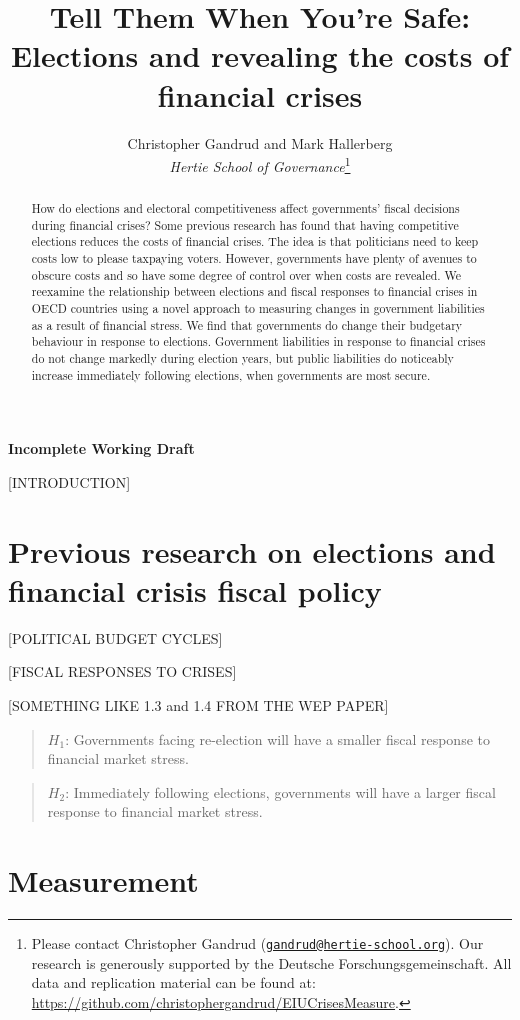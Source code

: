 \documentclass[]{article}
\title{Tell Them When You're Safe: Elections and revealing the costs of financial crises}
\author{Christopher Gandrud and Mark Hallerberg \\ \emph{Hertie School of Governance}\footnote{Please contact Christopher Gandrud
(\href{mailto:gandrud@hertie-school.org}{\nolinkurl{gandrud@hertie-school.org}}).
Our research is generously supported by the Deutsche Forschungsgemeinschaft.
All data and replication material can be found at:
\url{https://github.com/christophergandrud/EIUCrisesMeasure}.}}
\begin{document}
\maketitle


\textbf{Incomplete Working Draft}

\begin{abstract}
How do elections and electoral competitiveness affect governments' fiscal decisions during financial crises? Some previous research has found that having competitive elections reduces the costs of financial crises. The idea is that politicians need to keep costs low to please taxpaying voters. However, governments have plenty of avenues to obscure costs and so have some degree of control over when costs are revealed. We reexamine the relationship between elections and fiscal responses to financial crises in OECD countries using a novel approach to measuring changes in government liabilities as a result of financial stress. We find that governments do change their budgetary behaviour in response to elections. Government liabilities in response to financial crises do not change markedly during election years, but public liabilities do noticeably increase immediately following elections, when governments are most secure. 

\end{abstract}

[INTRODUCTION]

\section{Previous research on elections and financial crisis fiscal policy}

[POLITICAL BUDGET CYCLES]

[FISCAL RESPONSES TO CRISES]

[SOMETHING LIKE 1.3 and 1.4 FROM THE WEP PAPER]

\begin{quote}
        $H_{1}$: Governments facing re-election will have a smaller fiscal response to financial market stress.
\end{quote}

\begin{quote}
        $H_{2}$: Immediately following elections, governments will have a larger fiscal response to financial market stress.
\end{quote}

\section{Measurement}
\end{document}

